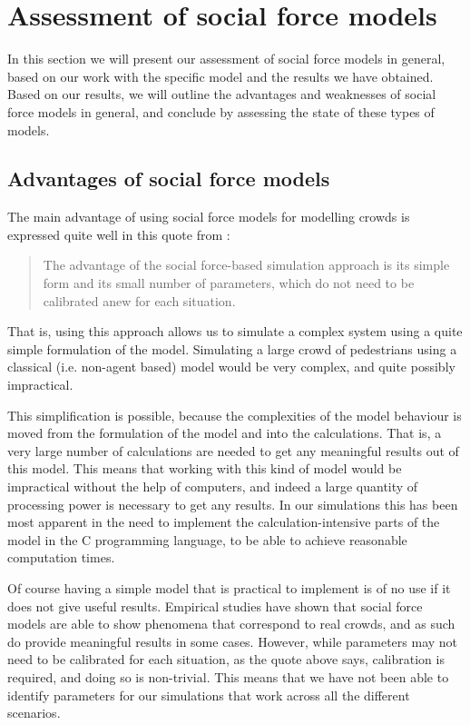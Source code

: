 \section{Assessment of social force models}
\label{sec:assessment}
In this section we will present our assessment of social force models in 
general, based on our work with the specific model and the results we have 
obtained. Based on our results, we will outline the advantages and weaknesses 
of social force models in general, and conclude by assessing the state of 
these types of models.

\subsection{Advantages of social force models}
The main advantage of using social force models for modelling crowds is 
expressed quite well in this quote from \cite{self-org}:

\begin{quote}
    The advantage of the social force-based simulation approach is its simple 
    form and its small number of parameters, which do not need to be 
    calibrated anew for each situation.
\end{quote}

That is, using this approach allows us to simulate a complex system using a 
quite simple formulation of the model. Simulating a large crowd of pedestrians 
using a classical (i.e. non-agent based) model would be very complex, and 
quite possibly impractical.

This simplification is possible, because the complexities of the model 
behaviour is moved from the formulation of the model and into the 
calculations. That is, a very large number of calculations are needed to get 
any meaningful results out of this model. This means that working with this 
kind of model would be impractical without the help of computers, and indeed a 
large quantity of processing power is necessary to get any results. In our 
simulations this has been most apparent in the need to implement the 
calculation-intensive parts of the model in the C programming language, to be 
able to achieve reasonable computation times.

Of course having a simple model that is practical to implement is of no use if 
it does not give useful results. Empirical studies have shown that social 
force models are able to show phenomena that correspond to real crowds, and as 
such do provide meaningful results in some cases. However, while parameters 
may not need to be calibrated for each situation, as the quote above says, 
calibration is required, and doing so is non-trivial. This means that we have 
not been able to identify parameters for our simulations that work across all 
the different scenarios.

